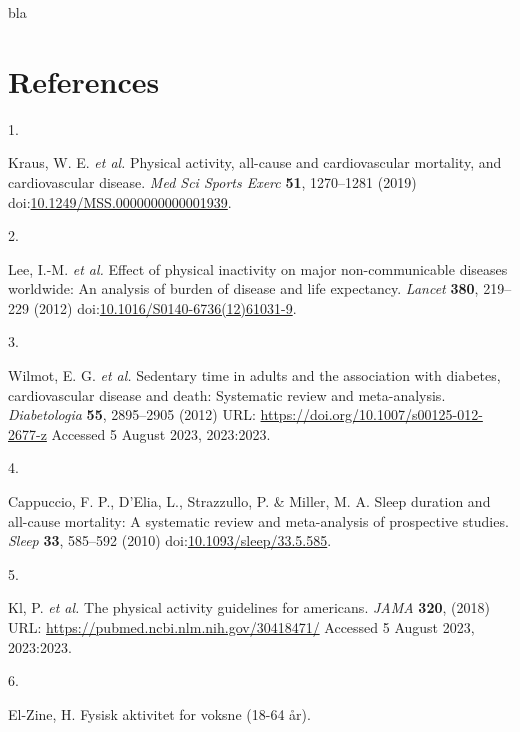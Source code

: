\documentclass[
  10pt,
]{scrbook}
\newlength{\cslhangindent}
\newlength{\csllabelwidth}
\newlength{\cslentryspacingunit} %
\newenvironment{CSLReferences}[2] %
 {%
  \setlength{\parindent}{0pt}
  \ifodd #1
  \let\oldpar\par
  \def\par{\hangindent=\cslhangindent\oldpar}
  \fi
  \setlength{\parskip}{#2\cslentryspacingunit}
 }%
 {}
\newcommand{\CSLLeftMargin}[1]{\parbox[t]{\csllabelwidth}{#1}}
\newcommand{\CSLRightInline}[1]{\parbox[t]{\linewidth - \csllabelwidth}{#1}\break}
\begin{document}
bla

\hypertarget{references}{%
\chapter{References}\label{references}}

\hypertarget{refs}{}
\begin{CSLReferences}{0}{0}
\leavevmode{}%
\CSLLeftMargin{1. }%
\CSLRightInline{Kraus, W. E. \emph{et al.} Physical activity, all-cause
and cardiovascular mortality, and cardiovascular disease. \emph{Med Sci
Sports Exerc} \textbf{51}, 1270--1281 (2019)
doi:\href{https://doi.org/10.1249/MSS.0000000000001939}{10.1249/MSS.0000000000001939}.}

\leavevmode{}%
\CSLLeftMargin{2. }%
\CSLRightInline{Lee, I.-M. \emph{et al.} Effect of physical inactivity
on major non-communicable diseases worldwide: An analysis of burden of
disease and life expectancy. \emph{Lancet} \textbf{380}, 219--229 (2012)
doi:\href{https://doi.org/10.1016/S0140-6736(12)61031-9}{10.1016/S0140-6736(12)61031-9}.}

\leavevmode{}%
\CSLLeftMargin{3. }%
\CSLRightInline{Wilmot, E. G. \emph{et al.} Sedentary time in adults and
the association with diabetes, cardiovascular disease and death:
Systematic review and meta-analysis. \emph{Diabetologia} \textbf{55},
2895--2905 (2012) URL: \url{https://doi.org/10.1007/s00125-012-2677-z}
Accessed 5 August 2023, 2023:2023.}

\leavevmode{}%
\CSLLeftMargin{4. }%
\CSLRightInline{Cappuccio, F. P., D'Elia, L., Strazzullo, P. \& Miller,
M. A. Sleep duration and all-cause mortality: A systematic review and
meta-analysis of prospective studies. \emph{Sleep} \textbf{33}, 585--592
(2010)
doi:\href{https://doi.org/10.1093/sleep/33.5.585}{10.1093/sleep/33.5.585}.}

\leavevmode{}%
\CSLLeftMargin{5. }%
\CSLRightInline{Kl, P. \emph{et al.} The physical activity guidelines
for americans. \emph{{JAMA}} \textbf{320}, (2018) URL:
\url{https://pubmed.ncbi.nlm.nih.gov/30418471/} Accessed 5 August 2023,
2023:2023.}

\leavevmode{}%
\CSLLeftMargin{6. }%
\CSLRightInline{El-Zine, H. Fysisk aktivitet for voksne (18-64 år).}


\end{CSLReferences}
\end{document}

